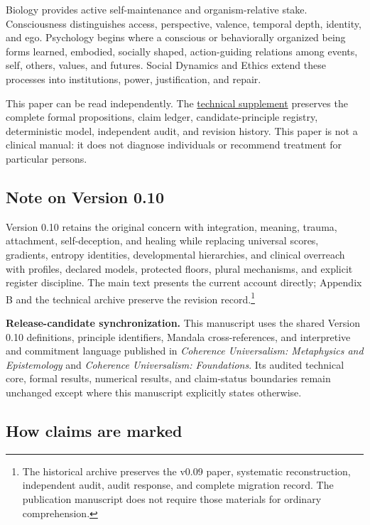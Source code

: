 \documentclass[
  11pt,
]{article}
\begin{document}
Biology provides active self-maintenance and organism-relative stake.
Consciousness distinguishes access, perspective, valence, temporal
depth, identity, and ego. Psychology begins where a conscious or
behaviorally organized being forms learned, embodied, socially shaped,
action-guiding relations among events, self, others, values, and
futures. Social Dynamics and Ethics extend these processes into
institutions, power, justification, and repair.

This paper can be read independently. The
\href{../supplements/06_Psychology_Technical_Supplement_v0.10.md}{technical
supplement} preserves the complete formal propositions, claim ledger,
candidate-principle registry, deterministic model, independent audit,
and revision history. This paper is not a clinical manual: it does not
diagnose individuals or recommend treatment for particular persons.

\subsection{Note on Version 0.10}\label{note-on-version-0.10}

Version 0.10 retains the original concern with integration, meaning,
trauma, attachment, self-deception, and healing while replacing
universal scores, gradients, entropy identities, developmental
hierarchies, and clinical overreach with profiles, declared models,
protected floors, plural mechanisms, and explicit register discipline.
The main text presents the current account directly; Appendix B and the
technical archive preserve the revision record.\footnote{The historical
  archive preserves the v0.09 paper, systematic reconstruction,
  independent audit, audit response, and complete migration record. The
  publication manuscript does not require those materials for ordinary
  comprehension.}

\textbf{Release-candidate synchronization.} This manuscript uses the
shared Version 0.10 definitions, principle identifiers, Mandala
cross-references, and interpretive and commitment language published in
\emph{Coherence Universalism: Metaphysics and Epistemology} and
\emph{Coherence Universalism: Foundations}. Its audited technical core,
formal results, numerical results, and claim-status boundaries remain
unchanged except where this manuscript explicitly states otherwise.

\subsection{How claims are marked}\label{how-claims-are-marked}
\end{document}
